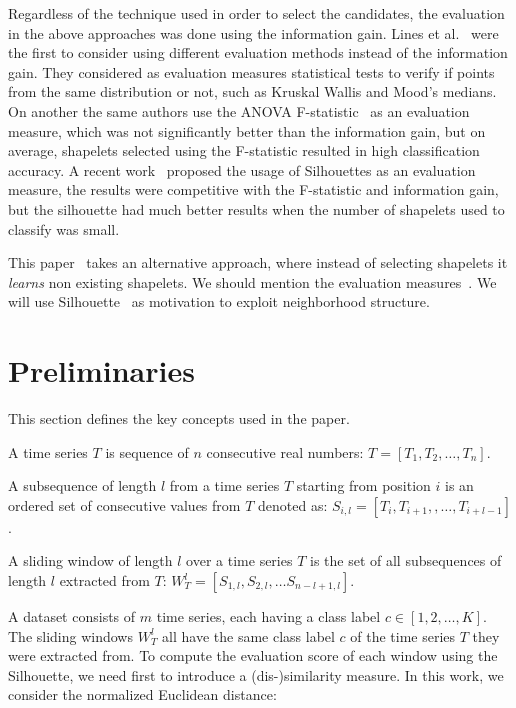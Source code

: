 \documentclass[sigconf, nonacm]{acmart}
\begin{document}
Regardless of the technique used in order to select the candidates, the
evaluation in the above approaches was done using the information gain.
Lines et al.~\cite{alternative_measures} were the first to consider using
different evaluation methods instead of the information gain. They considered
as evaluation measures statistical tests to verify if points from the same
distribution or not, such as Kruskal Wallis and Mood's medians. On another
the same authors use the ANOVA F-statistic~\cite{shapelet_transform} as an
evaluation measure, which was not significantly better than the information
gain, but on average, shapelets selected using the F-statistic resulted in high
classification accuracy.
A recent work~\cite{silhoutte_shapelets} proposed the usage of Silhouettes
\cite{silhouettes} as an evaluation measure, the results were competitive with
the F-statistic and information gain, but the silhouette had much better results
when the number of shapelets used to classify was small.


This paper~\cite{learning_shapelets} takes an alternative approach, where
instead of selecting shapelets it \emph{learns} non existing shapelets.
We should mention the evaluation measures~\cite{alternative_measures}.
We will use Silhouette~\cite{silhouettes} as motivation to exploit neighborhood
structure.


\section{Preliminaries}
This section defines the key concepts used in the paper.
\begin{definition}
	A time series $T$ is sequence of $n$ consecutive real numbers:
	$T = [T_1, T_2, \dots, T_n]$.
\end{definition}

\begin{definition}[Subsequence]
	A subsequence of length $l$ from a time series $T$ starting from position $i$
	is an ordered set of consecutive values from $T$ denoted as:
	$S_{i, l} = [T_i, T_{i+1},, \dots, T_{i+l-1}]$.
\end{definition}

\begin{definition}
	A sliding window of length $l$ over a time series $T$ is the set of
	all subsequences of length $l$ extracted from $T$:
	$W_T^l = [S_{1, l}, S_{2, l}, \dots S_{n-l+1, l}]$.
\end{definition}

A dataset consists of $m$ time series, each having a class label $c \in [1, 2,
		\dots, K]$. The sliding windows $W_T^l$ all have the same class label $c$ of the
time series $T$ they were extracted from. To compute the evaluation score of
each window using the Silhouette, we need first to introduce a (dis-)similarity
measure. In this work, we consider the normalized Euclidean distance:
\end{document}
